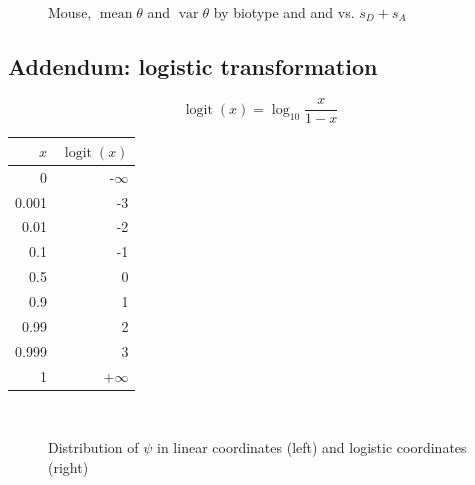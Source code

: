 \documentclass{article}
\DeclareMathOperator{\Var}{var}
\DeclareMathOperator{\mean}{mean}
\DeclareMathOperator{\logit}{logit}
\begin{document}
\begin{figure}[h!]
\begin{center}
%
\\
%
\caption{Mouse, $\mean\theta$ and $\Var\theta$ by biotype and and vs. $s_D+s_A$}
\end{center}
\end{figure}
\clearpage



\subsection{Addendum: logistic transformation}
\label{sec::logistic_transform}
$$\logit(x) = \log_{10}\frac{x}{1-x}$$
\vspace{1cm}
\begin{center}
\begin{tabular}{r|r}
\hline
$x$ & $\logit(x)$\\
\hline
0 & -$\infty$\\
0.001 & -3\\
0.01 & -2\\
0.1 & -1\\
0.5 & 0 \\
0.9 & 1\\
0.99 & 2\\
0.999 & 3\\
1 & +$\infty$\\
\hline
\end{tabular} 
\end{center}
\begin{figure}[h!]
\begin{center}
%
\\
\caption{Distribution of $\psi$ in linear coordinates (left) and logistic coordinates (right)}
\end{center}
\end{figure}
\clearpage
\end{document}
